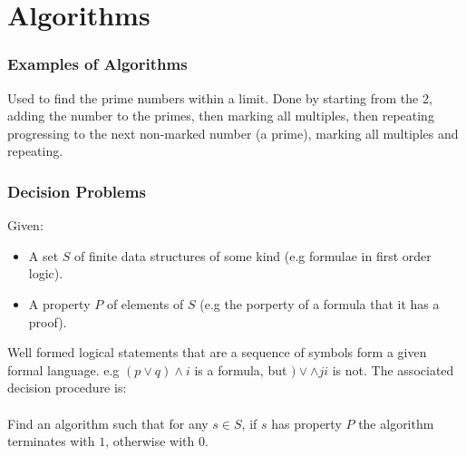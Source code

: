 \documentclass{report}
\begin{document}
    \section*{Algorithms}
        \subsubsection*{Examples of Algorithms}
            \begin{itemize}
                 {
                    Used to find the prime numbers within a limit. Done by starting from the 2, adding the number to the primes, then marking all multiples, then repeating progressing to the next non-marked number (a prime), marking all multiples and repeating.
                    
                }
            \end{itemize}

        \subsubsection{Decision Problems}
            Given:
            \begin{itemize}
                \item A set $S$ of finite data structures of some kind (e.g formulae in first order logic).
                \item A property $P$ of elements of $S$ (e.g the porperty of a formula that it has a proof).
            \end{itemize}
             {Well formed logical statements that are a sequence of symbols form a given formal language. e.g $(p \lor q) \land i$ is a formula, but $) \lor \land j i$ is not.}
            The associated decision procedure is:
            \\
            \\ Find an algorithm such that for any $s \in S$, if $s$ has property $P$ the algorithm terminates with $1$, otherwise with $0$.
        
\end{document}
